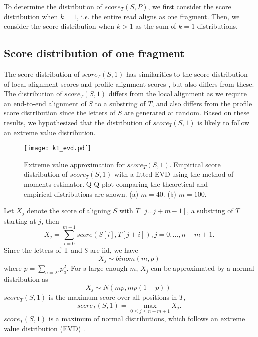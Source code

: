 To determine the distribution of $score_T(S, P)$, we first consider the score
distribution when $k = 1$, i.e. the entire read aligns as one fragment.
Then, we consider the score distribution when $k > 1$ as the sum of $k =
1$ distributions.

\subsection{Score distribution of one fragment}
The score distribution of $score_T(S,1)$ has similarities to the score
distribution of local alignment scores
\citep{smith1983statistical,altschul199627} and profile alignment scores
\citep{goldstein1994approximations}, but also differs from these.  The
distribution of $score_T(S,1)$ differs from the local alignment as we
require an end-to-end alignment of $S$ to a substring of $T$, and also
differs from the profile score distribution since the letters of $S$ are
generated at random.
Based on these results, we hypothesized that the distribution of
$score_T(S,1)$ is likely to follow an extreme value distribution.

\begin{figure}[t!]
\centering
\texttt{[image: k1\_evd.pdf]}
\caption[Extreme value distribution approximation for $score_T(S,1)$]{
  Extreme value approximation for $score_T(S,1)$.
  Empirical score distribution of $score_T(S,1)$ with a fitted
  EVD using the method of moments estimator.
  Q-Q plot comparing the theoretical and empirical distributions are shown.
  (a) $m=40$.
  (b) $m=100$.}
\label{evd_approx}
\end{figure}

Let $X_j$ denote the score of aligning $S$ with $T[j \dots j+m-1]$, a
substring of $T$ starting at $j$, then
\[X_j = \sum_{i=0}^{m-1} score(S[i],T[j+i]), j = 0, \dots, n-m+1.\]
Since the letters of T and S are iid, we have \[X_j \sim binom(m,p)\]
where $p = \sum_{a=\Sigma} p_a^2$.  For a large enough $m$, $X_j$ can
be approximated by a normal distribution as \[X_j \sim N(mp, mp(1-p)).
\] $score_T(S,1)$ is the maximum score over all positions in $T$,
\[score_T(S,1) = \max_{0 \leq j \leq n-m+1} X_j.\] $score_T(S,1)$ is a
maximum of normal distributions, which follows an extreme value
distribution (EVD) \citep{kotz2000extreme}.

